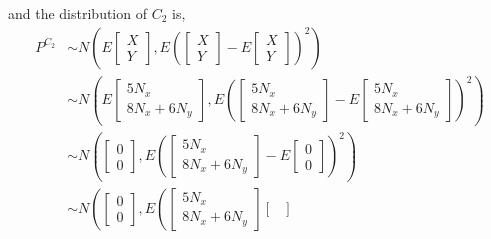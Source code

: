 \documentclass{article}
\begin{document}
    and the distribution of $C_2$ is,
    \begin{align*}
        P^{C_2} &\sim N\left(E\begin{bmatrix}
            X \\
            Y
        \end{bmatrix}, E \left ( \begin{bmatrix}
            X\\ Y
        \end{bmatrix}-E\begin{bmatrix}
            X \\
            Y
        \end{bmatrix}\right)^2\right)\\
        &\sim N \left (E \begin{bmatrix}
            5N_x\\
            8N_x +6N_y
        \end{bmatrix}, E\left (  \begin{bmatrix}
            5N_x\\
            8N_x +6N_y
        \end{bmatrix}-E \begin{bmatrix}
            5N_x\\
            8N_x +6N_y
        \end{bmatrix}\right)^2 \right)\\
        &\sim N \left ( \begin{bmatrix}
            0 \\
            0
        \end{bmatrix},  E\left (  \begin{bmatrix}
            5N_x\\
            8N_x +6N_y
        \end{bmatrix}-E \begin{bmatrix}
            0\\
            0
        \end{bmatrix}\right)^2\right)\\
        &\sim N \left ( \begin{bmatrix}
            0 \\
            0
        \end{bmatrix}, E \left ( \begin{bmatrix}
            5N_x\\
            8N_x +6N_y
        \end{bmatrix} \begin{bmatrix}

\end{bmatrix}
\end{align*}
\end{document}
